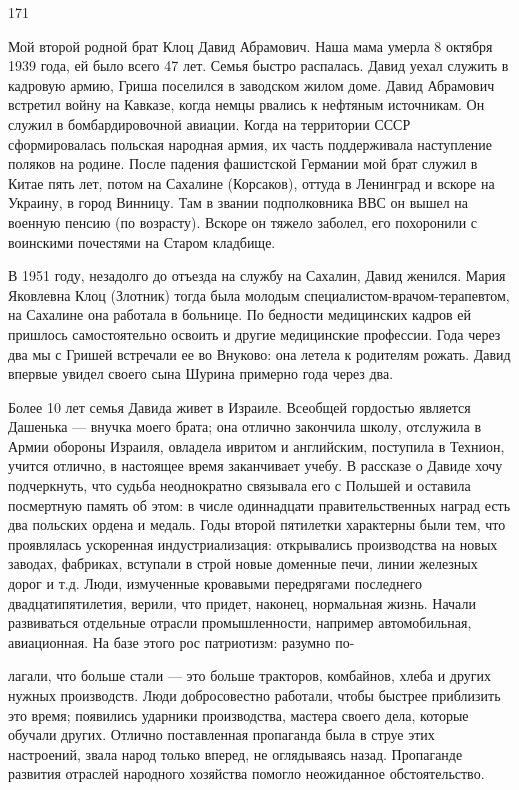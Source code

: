 171

Мой второй родной брат Клоц Давид Абрамович. Наша мама умерла 8 октября 1939 года, ей было всего 47 лет. Семья быстро распалась. Давид уехал служить в кадровую армию, Гриша поселился в заводском жилом доме. Давид Абрамович встретил войну на Кавказе, когда немцы рвались к нефтяным источникам. Он служил в бомбардировочной авиации. Когда на территории СССР сформировалась польская народная армия, их часть поддерживала наступление поляков на родине. После падения фашистской Германии мой брат служил в Китае пять лет, потом на Сахалине (Корсаков), оттуда в Ленинград и вскоре на Украину, в город Винницу. Там в звании подполковника ВВС он вышел на военную пенсию (по возрасту). Вскоре он тяжело заболел, его похоронили с воинскими почестями на Старом кладбище.

В 1951 году, незадолго до отъезда на службу на Сахалин, Давид женился. Мария Яковлевна Клоц (Злотник) тогда была молодым специалистом-врачом-терапевтом, на Сахалине она работала в больнице. По бедности медицинских кадров ей пришлось самостоятельно освоить и другие медицинские профессии. Года через два мы с Гришей встречали ее во Внуково: она летела к родителям рожать. Давид впервые увидел своего сына Шурина примерно года через два.

Более 10 лет семья Давида живет в Израиле. Всеобщей гордостью является Дашенька — внучка моего брата; она отлично закончила школу, отслужила в Армии обороны Израиля, овладела ивритом и английским, поступила в Технион, учится отлично, в настоящее время заканчивает учебу. В рассказе о Давиде хочу подчеркнуть, что судьба неоднократно связывала его с Польшей и оставила посмертную память об этом: в числе одиннадцати правительственных наград есть два польских ордена и медаль. Годы второй пятилетки характерны были тем, что проявлялась ускоренная индустриализация: открывались производства на новых заводах, фабриках, вступали в строй новые доменные печи, линии железных дорог и т.д. Люди, измученные кровавыми передрягами последнего двадцатипятилетия, верили, что придет, наконец, нормальная жизнь. Начали развиваться отдельные отрасли промышленности, например автомобильная, авиационная. На базе этого рос патриотизм: разумно по-

лагали, что больше стали — это больше тракторов, комбайнов, хлеба и других нужных производств. Люди добросовестно работали, чтобы быстрее приблизить это время; появились ударники производства, мастера своего дела, которые обучали других. Отлично поставленная пропаганда была в струе этих настроений, звала народ только вперед, не оглядываясь назад. Пропаганде развития отраслей народного хозяйства помогло неожиданное обстоятельство.

